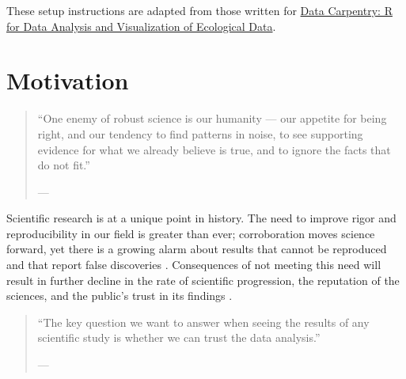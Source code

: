 \documentclass[
  12pt, krantz2,
]{book}
\theoremstyle{definition}
\theoremstyle{definition}
\theoremstyle{definition}
\newcommand{\1}{\mathbbm{1}}
\begin{document}
These setup instructions are adapted from those written for \href{http://www.datacarpentry.org/R-ecology-lesson/}{Data Carpentry: R
for Data Analysis and Visualization of Ecological
Data}.

\hypertarget{motivation}{%
\chapter*{Motivation}\label{motivation}}


\begin{quote}
``One enemy of robust science is our humanity --- our appetite for
being right, and our tendency to find patterns in noise, to see supporting
evidence for what we already believe is true, and to ignore the facts that do
not fit.''

--- \citet{naturenews_2015}
\end{quote}

Scientific research is at a unique point in history. The need to improve rigor
and reproducibility in our field is greater than ever; corroboration moves
science forward, yet there is a growing alarm about results that cannot be
reproduced and that report false discoveries \citep{baker2016there}. Consequences of
not meeting this need will result in further decline in the rate of scientific
progression, the reputation of the sciences, and the public's trust in its
findings \citep{munafo2017manifesto, naturenews2_2015}.

\begin{quote}
``The key question we want to answer when seeing the results of any scientific
study is whether we can trust the data analysis.''

--- \citet{peng2015reproducibility}
\end{quote}
\end{document}
